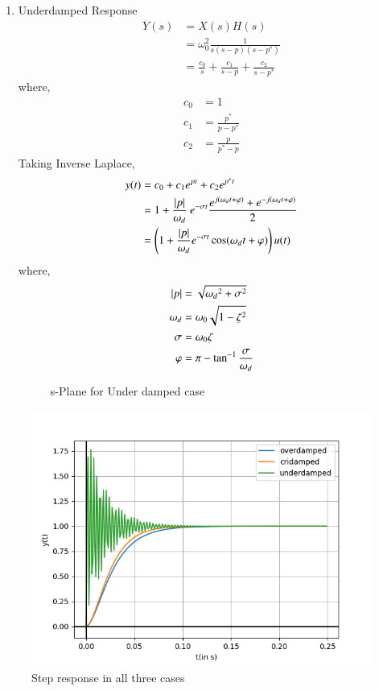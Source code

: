 \documentclass[journal,12pt,twocolumn]{IEEEtran}
\theoremstyle{remark}
\begin{document}
\begin{enumerate}
\item Underdamped Response
\begin{align}
    Y(s) &= X(s)H(s)\\
    &= \omega_0^2\frac{1}{s(s-p)(s-p^\ast)}\\
    &= \frac{c_0}{s}+\frac{c_1}{s-p}+\frac{c_2}{s-p^\ast}
\end{align}
where,
\begin{align}
    c_0 &= 1\\
    c_1 &= \frac{p^\ast}{p-p^\ast}\\
    c_2 &= \frac{p}{p^\ast-p}
\end{align}
Taking Inverse Laplace,
\begin{align}
    y(t) &= c_0+c_1e^{pt}+c_2e^{p^\ast t}\\
    &= 1+\frac{\left\vert p\right\vert}{\omega_d}\ e^{-\sigma t}\frac{
    e^{j(\omega_d t+\varphi)}+e^{-j(\omega_d t+\varphi)}}{2}\\
    &= \left(1+\frac{|p|}{\omega_d}e^{-\sigma t}\cos(\omega_d t+\varphi)\right)u(t)
\end{align}
where,
\begin{align}
    \left\vert p\right\vert&=\sqrt{{\omega_d}^2+\sigma^2}\\
    \omega_d&=\omega_0\sqrt{1-\zeta^2}\\
    \sigma&=\omega_0\zeta\\
    \varphi&=\pi-\tan^{-1}\frac{\sigma}{\omega_d}
\end{align}
\begin{figure}[!ht]
    \centering
    
    \caption{s-Plane for Under damped case}
\end{figure}
\end{enumerate}
\begin{figure}[!ht]
    \centering
    \includegraphics[width = \columnwidth]{figs/plot.png}
    \caption{Step response in all three cases}
\end{figure}
\end{document}
